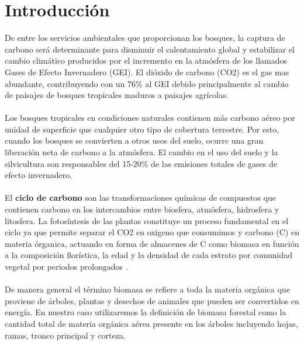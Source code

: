 \newpage{\ } 
\thispagestyle{empty} 

\chapter{Introducción}

De entre los servicios ambientales que proporcionan los bosques, la captura de carbono ser\'a determinante para disminuir el calentamiento global y estabilizar el cambio clim\'atico producidos por el incremento en la atmósfera de los llamados Gases de Efecto Invernadero (GEI). El di\'oxido de carbono (CO2) es el gas mas abundante, contribuyendo con un 76\% al GEI \cite{avila2001almacenamiento} debido principalmente al cambio de paisajes de bosques tropicales maduros a paisajes agr\'icolas.\\~\\
Los bosques tropicales en condiciones naturales contienen m\'as carbono a\'ereo por unidad de superficie que cualquier otro tipo de cobertura terrestre. Por esto, cuando los bosques se convierten a otros usos del suelo, ocurre una gran liberaci\'on neta de carbono a la atm\'osfera. El cambio en el uso del suelo y la silvicultura son responsables del 15-20\% de las emisiones totales de gases de efecto invernadero\cite{peralta2013analisis}.\\~\\
El \textbf{ciclo de carbono} son las transformaciones qu\'imicas de compuestos que contienen carbono en los intercambios entre biosfera, atm\'osfera, hidrosfera y litosfera. La fotosíntesis de las plantas constituye un proceso fundamental en el ciclo ya que permite separar  el CO2 en oxigeno que consumimos y carbono (C) en materia \'organica, actuando en forma de almacenes de C como biomasa en función a la composición flor\'istica, la edad y la densidad de cada estrato por comunidad vegetal por periodos prolongados \cite{acosta2003diseno}.\\~\\
De manera general el t\'ermino biomasa se refiere a toda la materia org\'anica que proviene de \'arboles, plantas y desechos de animales que pueden ser convertidos en energ\'ia. En nuestro caso utilizaremos la definici\'on de biomasa forestal como la cantidad total de materia org\'anica a\'erea presente en los \'arboles incluyendo hojas, ramas, tronco principal y corteza\cite{garzuglia2003wood}.\\~\\
